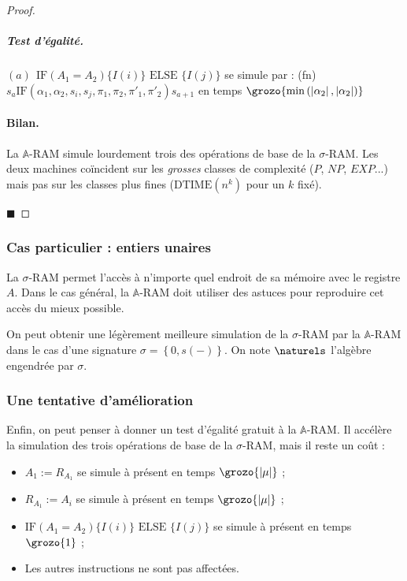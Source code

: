 \documentclass{report}
\newcommand{\sRAMifc}[2]{\text{IF} (A_1=A_2) \{I( #1 )\} \text{ ELSE } \{I( #2 )\}}
\newcommand{\bbA}{\mathbb{A}}
\begin{document}
\begin{proof}
						\subparagraph{Test d'égalité.}
						$(a) \:\: \sRAMifc{i}{j}$ se simule par : (fn) $s_a \text{IF}\left( \alpha_1, \alpha_2, s_i, s_j, \pi_1, \pi_2, \pi'_1, \pi'_2 \right) s_{a+1}$ en temps $\grozo{\min\left( \left| \alpha_2\right|, \left| \alpha_2 \right| \right)}$
						
						
					\paragraph{Bilan.}
					La $\bbA$-RAM simule lourdement trois des opérations de base de la $\sigma$-RAM. Les deux machines coïncident sur les \emph{grosses} classes de complexité ($P$, $NP$, $EXP$...) mais pas sur les classes plus fines ($\text{DTIME}(n^k)$ pour un $k$ fixé).
						
					$\blacksquare$
				\end{proof}
				
				
				
				
				\subsubsection{Cas particulier : entiers unaires}
				\label{subsubsec:sim_succ_RAM_N_RAM}
							
				La $\sigma$-RAM permet l'accès à n'importe quel endroit de sa mémoire avec le registre $A$. Dans le cas général, la $\bbA$-RAM doit utiliser des astuces pour reproduire cet accès du mieux possible. 
				
				
				On peut obtenir une légèrement meilleure simulation de la $\sigma$-RAM par la $\bbA$-RAM dans le cas d'une signature $\sigma = \left\lbrace 0, s(-)\right\rbrace$. On note $\naturels$ l'algèbre engendrée par $\sigma$.
	
	
	
				\subsubsection{Une tentative d'amélioration}
				\label{subsubsec:sim_amelioration}
				
				Enfin, on peut penser à donner un test d'égalité gratuit à la $\bbA$-RAM. Il accélère la simulation des trois opérations de base de la $\sigma$-RAM, mais il reste un coût : 
				
				\begin{itemize}[itemsep=-1mm]
					\item 	$A_1 := R_{A_1}$ se simule à présent en temps $\grozo{\left| \mu \right|}$ ;
					\item 	$R_{A_1} := A_i$ se simule à présent en temps $\grozo{\left| \mu \right|}$ ;
					\item 	$\sRAMifc{i}{j}$ se simule à présent en temps $\grozo{1}$ ;
					\item 	Les autres instructions ne sont pas affectées.
				\end{itemize}
				
\end{document}
